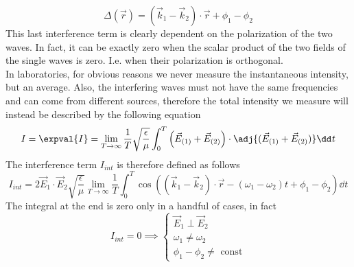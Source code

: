 \documentclass[../electromagnetism.tex]{subfiles}
\begin{document}
\begin{equation}
	\Delta(\vec{r})=(\vec{k}_1-\vec{k}_2)\cdot\vec{r}+\phi_1-\phi_2
	\label{eq:Deltar.int}
\end{equation}
This last interference term is clearly dependent on the polarization of the two waves. In fact, it can be exactly zero when the scalar product of the two fields of the single waves is zero. I.e. when their polarization is orthogonal.\\
In laboratories, for obvious reasons we never measure the instantaneous intensity, but an average. Also, the interfering waves must not have the same frequencies and can come from different sources, therefore the total intensity we measure will instead be described by the following equation
\begin{equation}
	I=\expval{I}=\lim_{T\to\infty}\frac{1}{T}\sqrt{\frac{\epsilon}{\mu}}\int_{0}^{T}\left( \vec{E}_{(1)}+\vec{E}_{(2)} \right)\cdot\adj{(\vec{E}_{(1)}+\vec{E}_{(2)})}\dd^{}{t}
	\label{eq:iexpval.int}
\end{equation}
The interference term $I_{int}$ is therefore defined as follows
\begin{equation}
	I_{int}=2\vec{E}_1\cdot\vec{E}_2\sqrt{\frac{\epsilon}{\mu}}\lim_{T\to\infty}\frac{1}{T}\int_{0}^{T}\cos\left( \left( \vec{k}_1-\vec{k}_2 \right)\cdot\vec{r}-(\omega_1-\omega_2)t +\phi_1-\phi_2\right)\dd^{}{t}
	\label{eq:inttermreal.int}
\end{equation}
The integral at the end is zero only in a handful of cases, in fact
\begin{equation}
	I_{int}=0\implies\begin{cases}
		\vec{E}_1\perp\vec{E}_2\\
		\omega_1\ne\omega_2\\
		\phi_1-\phi_2\ne\text{ const}
	\end{cases}
	\label{eq:casesnoint.int}
\end{equation}
\end{document}
